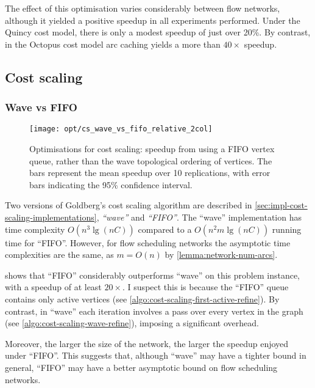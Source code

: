 The effect of this optimisation varies considerably between flow networks, although it yielded a positive speedup in all experiments performed. Under the Quincy cost model, there is only a modest speedup of just over 20\%. By contrast, in the Octopus cost model arc caching yields a more than $40\times$ speedup\footnotemark.

\subsection{Cost scaling}

\subsubsection{Wave vs FIFO}

\begin{figure}
    \centering
    \texttt{[image: opt/cs\_wave\_vs\_fifo\_relative\_2col]}
    \caption[Optimisations for cost scaling]{Optimisations for cost scaling: speedup from using a FIFO vertex queue, rather than the wave topological ordering of vertices. The bars represent the mean speedup over 10 replications, with error bars indicating the 95\% confidence interval.}
    \label{fig:opt-cs-wave-vs-fifo}
\end{figure}

Two versions of Goldberg's cost scaling algorithm are described in \cref{sec:impl-cost-scaling-implementations}, \emph{``wave''} and \emph{``FIFO''}. The ``wave'' implementation has time complexity $O\left(n^3 \lg \left(nC\right)\right)$ compared to a $O\left(n^2m\lg\left(nC\right)\right)$ running time for ``FIFO''. However, for flow scheduling networks the asymptotic time complexities are the same, as $m = O(n)$ by \cref{lemma:network-num-arcs}. 

 shows that ``FIFO'' considerably outperforms ``wave'' on this problem instance, with a speedup of at least $20\times$. I suspect this is because the ``FIFO'' queue contains only active vertices (see \cref{algo:cost-scaling-first-active-refine}). By contrast, in ``wave'' each iteration involves a pass over every vertex in the graph (see \cref{algo:cost-scaling-wave-refine}), imposing a significant overhead.

Moreover, the larger the size of the network, the larger the speedup enjoyed under ``FIFO''. This suggests that, although ``wave'' may have a tighter bound in general, ``FIFO'' may have a better asymptotic bound on flow scheduling networks.


